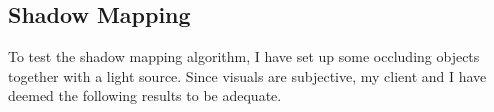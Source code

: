 \documentclass[../main/main.tex]{subfiles}
\begin{document}



\subsection{Shadow Mapping}
To test the shadow mapping algorithm, I have set up some occluding objects together with a light source. Since visuals are subjective, my client and I have deemed the following results to be adequate.

\begin{figure}[H]
    \centering


\end{figure}
\end{document}

